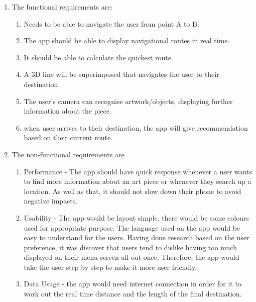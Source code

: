 \begin{enumerate}
    \item The functional requirements are:
    \begin{enumerate}
        \item Needs to be able to navigate the user from point A to B.
        \item The app should be able to display navigational routes in real time.
        \item It should be able to calculate the quickest route.
        \item A 3D line will be superimposed that navigates the user to their destination
        \item The user’s camera can recognise artwork/objects, displaying further information about the piece.
        \item when user arrives to their destination, the app will give recommendation based on their current route.
    \end{enumerate}
    \item The non-functional requirements are 
    \begin{enumerate}
        \item Performance -  The app should have quick response whenever a user wants to find more information about an art piece or whenever they search up a location. As well as that, it should not slow down their phone to avoid negative impacts.
        \item Usability - The app would be layout simple, there would be some colours used for appropriate purpose. The language used on the app would be easy to understand for the users. Having done research based on the user preference, it was discover that users tend to dislike having too much displayed on their menu screen all out once. Therefore, the app would take the user step by step to make it more user friendly.
        \item Data Usage - the app would need internet connection in order for it to work out the real time distance and the length of the final destination.
    \end{enumerate}
\end{enumerate}
